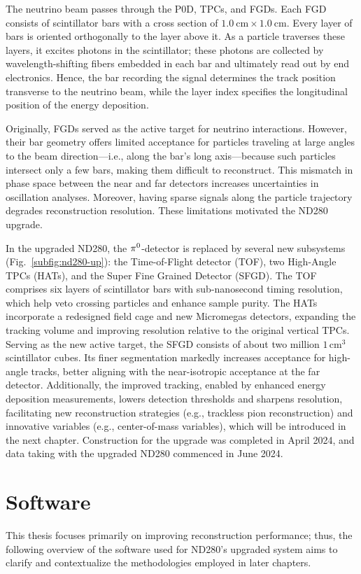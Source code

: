 The neutrino beam passes through the P0D, TPCs, and FGDs.  
Each FGD consists of scintillator bars with a cross section of \(1.0~\mathrm{cm} \times 1.0~\mathrm{cm}\).  
Every layer of bars is oriented orthogonally to the layer above it.  
As a particle traverses these layers, it excites photons in the scintillator; these photons are collected by wavelength-shifting fibers embedded in each bar and ultimately read out by end electronics.  
Hence, the bar recording the signal determines the track position transverse to the neutrino beam, while the layer index specifies the longitudinal position of the energy deposition.

Originally, FGDs served as the active target for neutrino interactions.  
However, their bar geometry offers limited acceptance for particles traveling at large angles to the beam direction—i.e., along the bar’s long axis—because such particles intersect only a few bars, making them difficult to reconstruct.  
This mismatch in phase space between the near and far detectors increases uncertainties in oscillation analyses.  
Moreover, having sparse signals along the particle trajectory degrades reconstruction resolution.  
These limitations motivated the ND280 upgrade.

In the upgraded ND280, the \(\pi^0\)-detector is replaced by several new subsystems (Fig.~\ref{subfig:nd280-up}): the Time-of-Flight detector (TOF), two High-Angle TPCs (HATs), and the Super Fine Grained Detector (SFGD).  
The TOF comprises six layers of scintillator bars with sub-nanosecond timing resolution, which help veto crossing particles and enhance sample purity.  
The HATs incorporate a redesigned field cage and new Micromegas detectors, expanding the tracking volume and improving resolution relative to the original vertical TPCs.  
Serving as the new active target, the SFGD consists of about two million \(1\,\mathrm{cm}^3\) scintillator cubes.  
Its finer segmentation markedly increases acceptance for high-angle tracks, better aligning with the near-isotropic acceptance at the far detector.  
Additionally, the improved tracking, enabled by enhanced energy deposition measurements, lowers detection thresholds and sharpens resolution, facilitating new reconstruction strategies (e.g., trackless pion reconstruction) and innovative variables (e.g., center-of-mass variables), which will be introduced in the next chapter.  
Construction for the upgrade was completed in April 2024, and data taking with the upgraded ND280 commenced in June 2024.

\section{Software}
\label{sec:t2k-sw}
This thesis focuses primarily on improving reconstruction performance; thus, the following overview of the software used for ND280’s upgraded system aims to clarify and contextualize the methodologies employed in later chapters.

